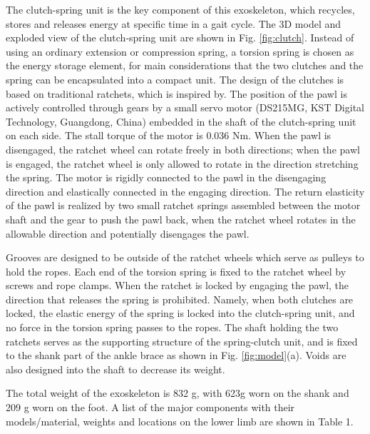 \documentclass[10pt]{asme2ej}
\begin{document}
The clutch-spring unit is the key component of this exoskeleton, which recycles, stores and releases energy at specific time in a gait cycle.
The 3D model and exploded view of the clutch-spring unit are shown in Fig. \ref{fig:clutch}.
Instead of using an ordinary extension or compression spring, a torsion spring is chosen as the energy storage element, for main considerations that the two clutches and the spring can be encapsulated into a compact unit.
The design of the clutches is based on traditional ratchets, which is inspired by\cite{RN19}.
The position of the pawl is actively controlled through gears by a small servo motor (DS215MG, KST Digital Technology, Guangdong, China) embedded in the shaft of the clutch-spring unit on each side.
The stall torque of the motor is 0.036 Nm.
When the pawl is disengaged, the ratchet wheel can rotate freely in both directions; when the pawl is engaged, the ratchet wheel is only allowed to rotate in the direction stretching the spring.
The motor is rigidly connected to the pawl in the disengaging direction and elastically connected in the engaging direction.
The return elasticity of the pawl is realized by two small ratchet springs assembled between the motor shaft and the gear to push the pawl back, when the ratchet wheel rotates in the allowable direction and potentially disengages the pawl.

Grooves are designed to be outside of the ratchet wheels which serve as pulleys to hold the ropes.
Each end of the torsion spring is fixed to the ratchet wheel by screws and rope clamps.
When the ratchet is locked by engaging the pawl, the direction that releases the spring is prohibited. 
Namely, when both clutches are locked, the elastic energy of the spring is locked into the clutch-spring unit, and no force in the torsion spring passes to the ropes.
The shaft holding the two ratchets serves as the supporting structure of the spring-clutch unit, and is fixed to the shank part of the ankle brace as shown in Fig. \ref{fig:model}(a).
Voids are also designed into the shaft to decrease its weight.

The total weight of the exoskeleton is 832 g, with 623g worn on the shank and 209 g worn on the foot.
A list of the major components with their models/material, weights and locations on the lower limb are shown in Table 1.

\end{document}
